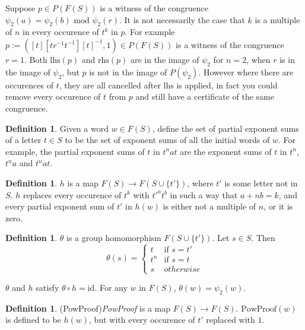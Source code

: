 \documentclass[11pt]{article} %
\theoremstyle{definition}
\theoremstyle{definition}
\theoremstyle{definition}
\theoremstyle{definition}
\theoremstyle{definition}
\newtheorem{defn}[theorem]{Definition}
\theoremstyle{definition}
\begin{document}
Suppose $p \in P(F(S))$ is a witness of the congruence
$\psi_2(a) = \psi_2(b) \text{ mod } \psi_2(r)$. It is not necessarily the case that $k$
is a multiple of $n$ in every occurence of $t^k$ in $p$. For example
$p := ([t][tr^{-1}t^{-1}][t]^{-1}, 1) \in P(F(S))$ is a witness of the congruence
$r = 1$. Both $\text{lhs}(p)$ and $\text{rhs}(p)$ are in the image of
$\psi_2$ for $n = 2$, when $r$ is in the image of $\psi_2$,
but $p$ is not in the image of $P(\psi_2)$. However where there are
occurences of $t$, they are all cancelled after $\text{lhs}$ is applied, in fact
you could remove every occurence of $t$ from $p$ and still have a certificate of the same
congruence.

\begin{defn}
  Given a word $w \in F(S)$, define the set of partial exponent sums of a letter $t \in S$ to
  be the set of exponent sums of all the initial words of $w$. For example, the partial
  exponent sums of $t$ in $t^n a t$ are the exponent sums of $t$ in
  $t^n$, $t^na$ and $t^nat$.
\end{defn}

\begin{defn}
  $h$ is a map $F(S) \to F(S \cup \{t'\})$, where $t'$ is some letter not in $S$.
  $h$ replaces every occurence of $t^k$ with $t'^at^b$ in such a way that $a + n b = k$,
  and every partial exponent sum of $t'$ in $h(w)$ is either not a multiple of $n$,
  or it is zero.
\end{defn}

\begin{defn}
  $\theta$ is a group homomorphism $F(S \cup \{t'\})$. Let $s \in S$. Then
  \begin{equation}
    \theta(s) = \begin{cases}
      t & \text{if } s = t' \\
      t^n & \text{if } s = t \\
      s & otherwise
    \end{cases}
  \end{equation}
\end{defn}

$\theta$ and $h$ satisfy $\theta \circ h = \text{id}$. For any $w$ in $F(S)$,
$\theta(w) = \psi_2(w)$.

\begin{defn}(PowProof)\label{PowProof}
  \textit{PowProof} is a map $F(S) \to F(S)$. $\text{PowProof}(w)$ is defined to be
  $h(w)$, but with every occurence of $t'$ replaced with $1$.
\end{defn}
\end{document}
